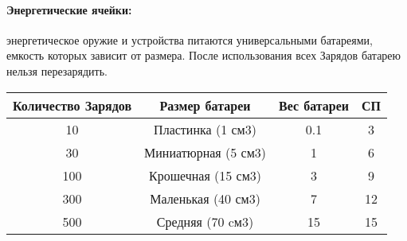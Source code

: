 \paragraph{Энергетические ячейки:} энергетическое оружие и устройства питаются универсальными батареями, емкость которых зависит от размера. После использования всех Зарядов батарею нельзя перезарядить.
\begin{center}
\begin{tabular}{|c|c|c|c|}
\hline
Количество Зарядов & Размер батареи & Вес батареи & СП \\ \hline
10 & Пластинка (1 см3) & 0.1 & 3 \\ \hline
30 & Миниатюрная (5 см3) & 1 & 6 \\ \hline
100 & Крошечная (15 см3) & 3 & 9 \\ \hline
300 & Маленькая (40 см3) & 7 & 12 \\ \hline
500 & Средняя (70 cм3) & 15 & 15 \\ \hline
\end{tabular}
\end{center}
